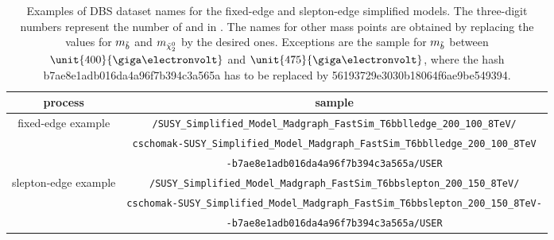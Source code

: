\begin{table}[htb] 
\scriptsize
\caption{Examples of DBS dataset names for the fixed-edge and slepton-edge simplified models. The three-digit numbers represent the number of \sbottom and \secondchi in \GeV. The names for other mass points are obtained by replacing the values for $m_{\tilde{b}}$ and $m_{{\tilde{\chi}^0_2}}$ by the desired ones. Exceptions are the sample for $m_{\tilde{b}}$ between $\unit{400}{\giga\electronvolt}$ and $\unit{475}{\giga\electronvolt}$, where the hash b7ae8e1adb016da4a96f7b394c3a565a has to be replaced by 56193729e3030b18064f6ae9be549394.}
\label{appTab:MCSamples2}
\begin{tabular}{c|c}
 process & sample \\
\hline 
 \multirow{3}{*}{fixed-edge example} & \verb+/SUSY_Simplified_Model_Madgraph_FastSim_T6bblledge_200_100_8TeV/+\\ & \verb+cschomak-SUSY_Simplified_Model_Madgraph_FastSim_T6bblledge_200_100_8TeV+\\ & \verb+-b7ae8e1adb016da4a96f7b394c3a565a/USER+\\
 \multirow{3}{*}{slepton-edge example} & \verb+/SUSY_Simplified_Model_Madgraph_FastSim_T6bbslepton_200_150_8TeV/+\\ & \verb+cschomak-SUSY_Simplified_Model_Madgraph_FastSim_T6bbslepton_200_150_8TeV-+\\ & \verb+-b7ae8e1adb016da4a96f7b394c3a565a/USER+\\
\end{tabular}


\end{table} 
